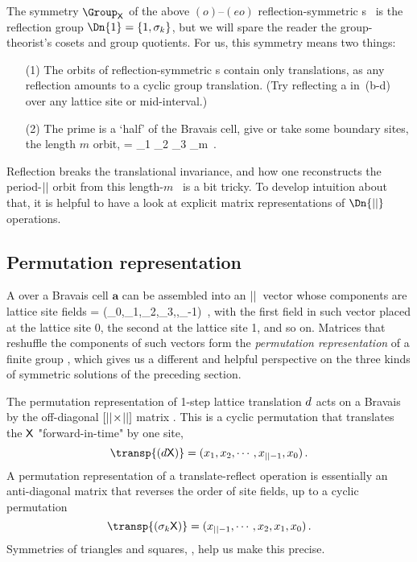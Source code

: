 The {\lattstate} {symmetry} $\Group_\Xx$  of the
above $(o)$--$(eo)$ reflection-symmetric {\lattstate}s \Xx\ is the reflection
group $\Dn{1}=\{1,\Refl_k\}$, but we will spare the reader the
group-theorist's cosets and group quotients. For us, this symmetry means
two things:
\begin{itemize}
  \item[(1)]
The \Dn{\infty} orbits of reflection-symmetric {\lattstate}s contain only
translations, as any reflection amounts to a cyclic group
\Cn{\cl{}} translation.
(Try reflecting a  {\lattstate} in \,(b-d)
over any lattice site or mid-interval.)
  \item[(2)]
The prime {\lattstate} is a `half' of the Bravais cell,
give or take some boundary sites, the length ${m}$ orbit,
\beq
\tilde{\Xx}      = \ssp_1 \ssp_2 \ssp_3 \cdots \ssp_{m}
\,.


\end{itemize}
Reflection breaks the translational invariance, and how one reconstructs
the period-${||}$ orbit from this length-$m$ \brick\ is a bit tricky. To
develop intuition about that, it is helpful to have a look at
explicit matrix
representations of $\Dn{\cl{}}$ operations.

\subsection{Permutation representation}
\label{sect:permReps}

A {\lattstate} {\Xx} over a Bravais cell $\mathbf{a}$ can be assembled
into an ${||}$\dmn\ vector whose components are lattice site fields
\beq
\transp{\Xx} = (\ssp_0,\ssp_1,\ssp_2,\ssp_3,\cdots,\ssp_{\cl{}-1})
\,,
with the first field in such vector placed at the lattice site 0, the
second at the lattice site 1, and so on. Matrices that reshuffle the
components of such vectors form the {\em permutation representation} of a
finite group \Group, which gives us a different and helpful
perspective on the three kinds of symmetric solutions of the preceding
section.

The permutation representation of 1-step lattice translation $d$
acts on a Bravais {\lattstate} by the off-diagonal
$[{||}\!\times\!{||}]$ matrix . This is a cyclic
\Cn{\cl{}} permutation that translates the {\lattstate} $\mathsf{X}$
"for\-ward-in-time" by one site,
\[
\transp{(\shift\Xx)}=(\ssp_1,\ssp_2,\cdots,\ssp_{\cl{}-1},\ssp_0)
\,.
\]
A permutation representation of a \Dn{\cl{}} translate-reflect operation
is essentially an anti-diagonal matrix that reverses the order of site
fields, up to a cyclic permutation
\[
\transp{(\Refl_k\Xx)}=(\ssp_{\cl{}-1},\cdots,\ssp_2,\ssp_1,\ssp_0)
\,.
\]
Symmetries of triangles and squares, , help us make this
precise.

